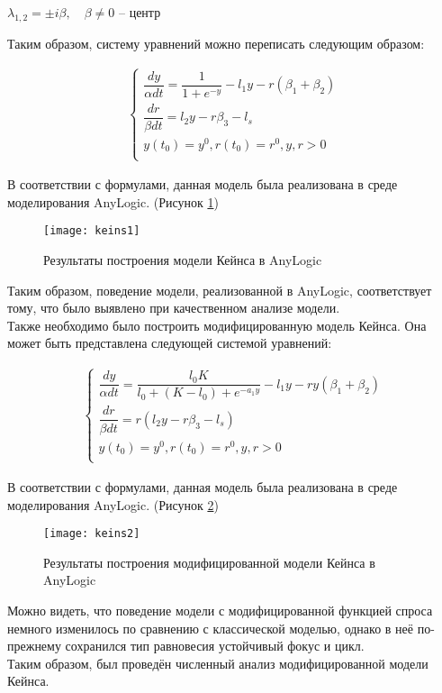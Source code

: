 $ \lambda_{1,2} = \pm i \beta, \quad \beta \neq 0 $ -- центр

Таким образом, систему уравнений можно переписать следующим образом:

\begin{align*}
	\begin{cases}
		\dfrac{dy}{\alpha dt} = \dfrac{1}{1 + e^{-y}} - l_1 y - r (\beta_1 + \beta_2)\\[10pt]
		\dfrac{dr}{\beta dt} = l_2 y - r \beta_3 - l_s\\
		y(t_0) = y^0, r(t_0) = r^0, y, r > 0\\
	\end{cases}
\end{align*}

\newpage

В соответствии с формулами, данная модель была реализована в среде моделирования AnyLogic. (Рисунок \ref{fig:keins1})
\begin{figure}[h]
	\centering \texttt{[image: keins1]}
	\caption{Результаты построения модели Кейнса в AnyLogic}
	\label{fig:keins1}
\end{figure}

Таким образом, поведение модели, реализованной в AnyLogic, соответствует тому, что было выявлено при качественном анализе модели.\\

Также необходимо было построить модифицированную модель Кейнса. Она может быть представлена следующей системой уравнений:

\begin{align*}
	\begin{cases}
		\dfrac{dy}{\alpha dt} = \dfrac{l_0 K}{l_0 + (K - l_0) + e^{-a_1 y}} - l_1 y - r y (\beta_1 + \beta_2)\\[10pt]
		\dfrac{dr}{\beta dt} = r(l_2 y - r \beta_3 - l_s)\\
		y(t_0) = y^0, r(t_0) = r^0, y, r > 0\\
	\end{cases}
\end{align*}

\newpage

В соответствии с формулами, данная модель была реализована в среде моделирования AnyLogic. (Рисунок \ref{fig:keins2})
\begin{figure}[h]
	\centering \texttt{[image: keins2]}
	\caption{Результаты построения модифицированной модели Кейнса в AnyLogic}
	\label{fig:keins2}
\end{figure}

Можно видеть, что поведение модели с модифицированной функцией спроса немного изменилось по сравнению с классической моделью, однако в неё по-прежнему сохранился тип равновесия устойчивый фокус и цикл.\\

Таким образом, был проведён численный анализ модифицированной модели Кейнса.\\